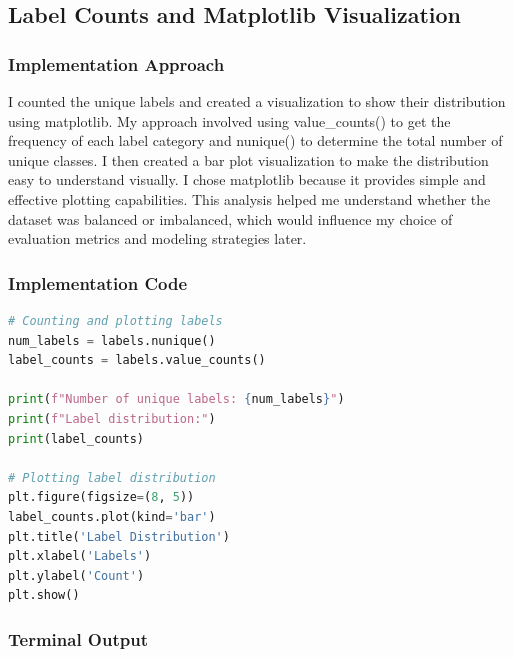 \documentclass[12pt,a4paper]{article}
\begin{document}
\subsection{Label Counts and Matplotlib Visualization}

\subsubsection{Implementation Approach}
I counted the unique labels and created a visualization to show their distribution using matplotlib. My approach involved using value\_counts() to get the frequency of each label category and nunique() to determine the total number of unique classes. I then created a bar plot visualization to make the distribution easy to understand visually. I chose matplotlib because it provides simple and effective plotting capabilities. This analysis helped me understand whether the dataset was balanced or imbalanced, which would influence my choice of evaluation metrics and modeling strategies later.

\newpage
\subsubsection{Implementation Code}
\begin{lstlisting}[language=Python, caption=Label Count Analysis and Matplotlib Visualization]
# Counting and plotting labels
num_labels = labels.nunique()
label_counts = labels.value_counts()

print(f"Number of unique labels: {num_labels}")
print(f"Label distribution:")
print(label_counts)

# Plotting label distribution
plt.figure(figsize=(8, 5))
label_counts.plot(kind='bar')
plt.title('Label Distribution')
plt.xlabel('Labels')
plt.ylabel('Count')
plt.show()
\end{lstlisting}

\subsubsection{Terminal Output}
\end{document}
